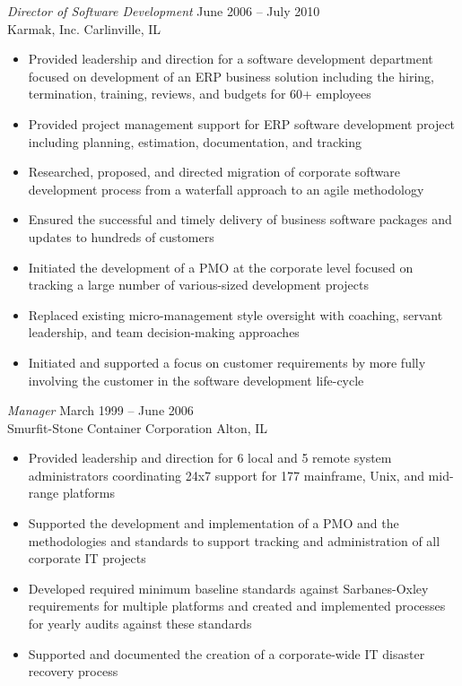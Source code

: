 \documentclass[margin,line]{resume}
\begin{document}
\begin{resume}
{\sl Director of Software Development} \hfill June 2006 -- July 2010\\
Karmak, Inc. \hfill Carlinville, IL
\begin{itemize} \itemsep -2pt %
\small\item Provided leadership and direction for a software development department focused on development of an ERP business solution including the hiring, termination, training, reviews, and budgets for 60+ employees
\small\item Provided project management support for ERP software development project including planning, estimation, documentation, and tracking
\small\item Researched, proposed, and directed migration of corporate software development process from a waterfall approach to an agile methodology
\small\item Ensured the successful and timely delivery of business software packages and updates to hundreds of customers
\small\item Initiated the development of a PMO at the corporate level focused on tracking a large number of various-sized development projects
\small\item Replaced existing micro-management style oversight with coaching, servant leadership, and team decision-making approaches
\small\item Initiated and supported a focus on customer requirements by more fully involving the customer in the software development life-cycle
\end{itemize}

{\sl Manager} \hfill March 1999 -- June 2006\\
Smurfit-Stone Container Corporation \hfill Alton, IL
\begin{itemize} \itemsep -2pt %
\small\item Provided leadership and direction for 6 local and 5 remote system administrators coordinating 24x7 support for 177 mainframe, Unix, and mid-range platforms
\small\item Supported the development and implementation of a PMO and the methodologies and standards to support tracking and administration of all corporate IT projects
\small\item Developed required minimum baseline standards against Sarbanes-Oxley requirements for multiple platforms and created and implemented processes for yearly audits against these standards
\small\item Supported and documented the creation of a corporate-wide IT disaster recovery process
\end{itemize}


\end{resume}
\end{document}
